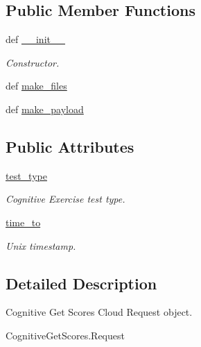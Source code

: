 \subsection*{Public Member Functions}
\begin{DoxyCompactItemize}
\item 
def \hyperlink{classRappCloud_1_1CloudMsgs_1_1CognitiveGetScores_1_1CognitiveGetScores_1_1Request_a6e9610eecaed8cf66d598fc204868ddb}{\-\_\-\-\_\-init\-\_\-\-\_\-}
\begin{DoxyCompactList}\small\item\em Constructor. \end{DoxyCompactList}\item 
def \hyperlink{classRappCloud_1_1CloudMsgs_1_1CognitiveGetScores_1_1CognitiveGetScores_1_1Request_aa463d376cc4fbdda69094de306942fbb}{make\-\_\-files}
\item 
def \hyperlink{classRappCloud_1_1CloudMsgs_1_1CognitiveGetScores_1_1CognitiveGetScores_1_1Request_af4d2890ad63b7037336df1053343c39b}{make\-\_\-payload}
\end{DoxyCompactItemize}
\subsection*{Public Attributes}
\begin{DoxyCompactItemize}
\item 
\hyperlink{classRappCloud_1_1CloudMsgs_1_1CognitiveGetScores_1_1CognitiveGetScores_1_1Request_a86df12bf13716a047579bc0796ca19bc}{test\-\_\-type}
\begin{DoxyCompactList}\small\item\em Cognitive Exercise test type. \end{DoxyCompactList}\item 
\hyperlink{classRappCloud_1_1CloudMsgs_1_1CognitiveGetScores_1_1CognitiveGetScores_1_1Request_a6636727d19775b0d8886fb2cd92b72aa}{time\-\_\-to}
\begin{DoxyCompactList}\small\item\em Unix timestamp. \end{DoxyCompactList}\end{DoxyCompactItemize}


\subsection{Detailed Description}
\begin{DoxyVerb}Cognitive Get Scores Cloud Request object.

CognitiveGetScores.Request
\end{DoxyVerb}
 

